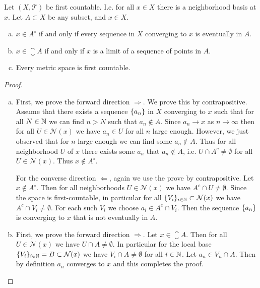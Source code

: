 \begin{proposition}
	Let $ (X,\mathcal{T}) $ be first countable. I.e. for all $ x \in X $ there is a neighborhood basis at $ x $. Let $ A \subset X $ be any subset, and $ x \in X $.
	\begin{enumerate}[(a)]
		\item $ x \in A^\circ $ if and only if every sequence in $ X $ converging to $ x $ is eventually in $ A $.
		\item $ x \in \closure{A} $ if and only if $ x $ is a limit of a sequence of points in $ A $.
		\item Every metric space is first countable.
	\end{enumerate}
\end{proposition}
\begin{proof}
	\begin{enumerate}[(a)]
		\item First, we prove the forward direction $ \boxed{\Longrightarrow} $. We prove this by contrapositive. Assume that there exists a sequence $ \{a_n\} $ in $ X $ converging to $ x $ such that for all $ N\in \mathbb{N} $ we can find $ n > N $ such that $ a_n \notin  A $. Since $ a_n \to x $ as $ n\to\infty $ then for all $ U \in \mathcal{N}(x) $ we have $ a_n \in U $ for all $ n $ large enough. However, we just observed that for $ n $ large enough we can find some $ a_n \notin A $. Thus for all neighborhood $ U $ of $ x $ there exists some $ a_n $ that $ a_n \notin A $, i.e. $ U \cap A^c \neq \emptyset $ for all $ U \in \mathcal{N}(x) $. Thus $ x \notin A^\circ $.
		
		\noindent For the converse direction $ \boxed{\Longleftarrow} $, again we use the prove by contrapositive. Let $ x \notin A^\circ $. Then for all neighborhoods $ U \in \mathcal{N}(x) $ we have $ A^c \cap U \neq \emptyset $. Since the space is first-countable, in particular for all $ \{V_i\}_{i\in\mathbb{N}}  \subset \mathcal{N}(x) $ we have $ A^c \cap V_i \neq \emptyset $. For each such $ V_i $ we choose $ a_i \in A^c\cap V_i $. Then the sequence $ \{a_n\} $ is converging to $ x $ that is not eventually in $ A $.
		
		\item First, we prove the forward direction $ \boxed{\Longrightarrow} $. Let $ x \in \closure{A} $. Then for all $ U \in \mathcal{N}(x) $ we have $ U \cap A \neq \emptyset $. In particular for the local base $ \{V_i\}_{i\in\mathbb{N}} =  B \subset \mathcal{N}(x) $ we have $ V_i \cap A \neq \emptyset $ for all $ i \in \mathbb{N} $. Let $ a_n \in V_n \cap A $. Then by definition $ a_n $ converges to $ x $ and this completes the proof.
		

\end{enumerate}
\end{proof}
